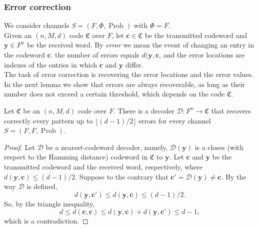 \subsubsection{Error correction}
We consider channels $S=(F,\Phi,\operatorname{Prob})$ with $\Phi = F$.\\
\indent Given an $(n,M,d)$ code $\mathfrak{C}$ over $F$, let $\mathbf{c}\in\mathfrak{C}$ be the transmitted codeword and $\mathbf{y}\in F^n$ be the received word. By \textit{error} we mean the event of changing an entry in the codeword $\mathbf{c}$. the number of errors equals $d(\mathbf{y},\mathbf{c}$, and the error locations are indexes of the entries in which $\mathbf{c}$ and $\mathbf{y}$ differ.\\
\indent The task of error correction is recovering the error locations and the error values. In the next lemma we show that errors are always recoverable, as long as their number does not exceed a certain threshold, which depends on the code $\mathfrak{C}$.
\begin{lemma}
Let $\mathfrak{C}$ be an $(n,M,d)$ code over $F$. There is a decoder $\mathcal{D}: F^n \to \mathfrak{C}$ that recovers correctly every pattern up to $\lfloor(d-1)/2\rfloor$ errors for every channel $S=(F,F,\operatorname{Prob})$.
\end{lemma}
\begin{proof}
Let $\mathcal{D}$ be a nearest-codeword decoder, namely, $\mathcal{D}(\mathbf{y})$ is a closes (with respect to the Hamming distance) codeword in $\mathfrak{C}$ to $\mathbf{y}$. Let $\mathbf{c}$ and $\mathbf{y}$ be the transmitted codeword and the received word, respectively, where $d(\mathbf{y}, \mathbf{c})\leq (d-1)/2$. Suppose to the contrary that $\mathbf{c}' = \mathcal{D}(\mathbf{y})\neq\mathbf{c}$. By the way $\mathcal{D}$ is defined,
\begin{equation}
d(\mathbf{y}, \mathbf{c}')\leq d(\mathbf{y}, \mathbf{c}) \leq (d-1)/2 . 
\end{equation}
So, by the triangle inequality,
\begin{equation}
d\leq d(\mathbf{c}, \mathbf{c}) \leq d(\mathbf{y}, \mathbf{c}) + d(\mathbf{y}, \mathbf{c}') \leq d-1, 
\end{equation}
which is a contradiction.
\end{proof}
